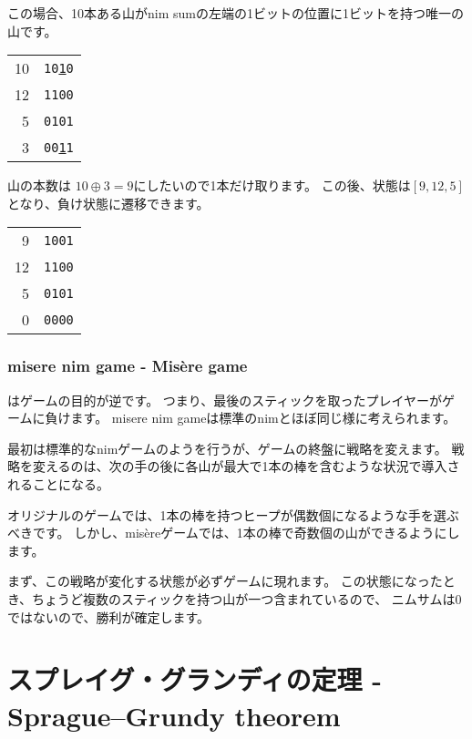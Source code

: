 この場合、10本ある山がnim sumの左端の1ビットの位置に1ビットを持つ唯一の山です。

\begin{center}
\begin{tabular}{r|r}
10 & \texttt{10\underline{1}0} \\
12 & \texttt{1100} \\
5 & \texttt{0101} \\
\hline
3 & \texttt{00\underline{1}1} \\
\end{tabular}
\end{center}

山の本数は $10 \oplus 3 = 9$にしたいので1本だけ取ります。
この後、状態は$[9, 12, 5]$となり、負け状態に遷移できます。

\begin{center}
\begin{tabular}{r|r}
9 & \texttt{1001} \\
12 & \texttt{1100} \\
5 & \texttt{0101} \\
\hline
0 & \texttt{0000} \\
\end{tabular}
\end{center}

\subsubsection{misere nim game - Misère game}


はゲームの目的が逆です。
つまり、最後のスティックを取ったプレイヤーがゲームに負けます。
misere nim gameは標準のnimとほぼ同じ様に考えられます。

最初は標準的なnimゲームのようを行うが、ゲームの終盤に戦略を変えます。
戦略を変えるのは、次の手の後に各山が最大で1本の棒を含むような状況で導入されることになる。

オリジナルのゲームでは、1本の棒を持つヒープが偶数個になるような手を選ぶべきです。
しかし、misèreゲームでは、1本の棒で奇数個の山ができるようにします。

まず、この戦略が変化する状態が必ずゲームに現れます。
この状態になったとき、ちょうど複数のスティックを持つ山が一つ含まれているので、
ニムサムは0ではないので、勝利が確定します。

\section{スプレイグ・グランディの定理 - Sprague–Grundy theorem}


